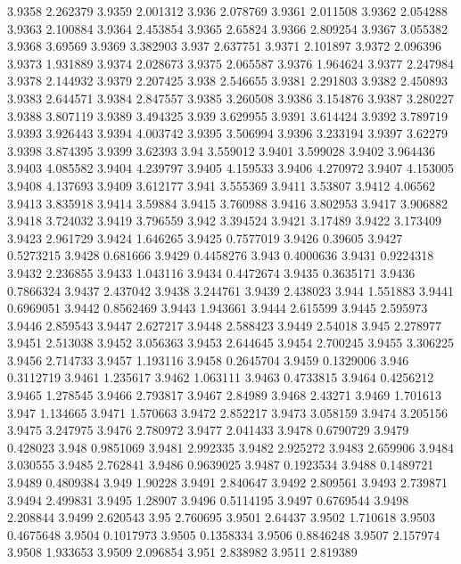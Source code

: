3.9358  2.262379
3.9359  2.001312
3.936  2.078769
3.9361  2.011508
3.9362  2.054288
3.9363  2.100884
3.9364  2.453854
3.9365  2.65824
3.9366  2.809254
3.9367  3.055382
3.9368  3.69569
3.9369  3.382903
3.937  2.637751
3.9371  2.101897
3.9372  2.096396
3.9373  1.931889
3.9374  2.028673
3.9375  2.065587
3.9376  1.964624
3.9377  2.247984
3.9378  2.144932
3.9379  2.207425
3.938  2.546655
3.9381  2.291803
3.9382  2.450893
3.9383  2.644571
3.9384  2.847557
3.9385  3.260508
3.9386  3.154876
3.9387  3.280227
3.9388  3.807119
3.9389  3.494325
3.939  3.629955
3.9391  3.614424
3.9392  3.789719
3.9393  3.926443
3.9394  4.003742
3.9395  3.506994
3.9396  3.233194
3.9397  3.62279
3.9398  3.874395
3.9399  3.62393
3.94  3.559012
3.9401  3.599028
3.9402  3.964436
3.9403  4.085582
3.9404  4.239797
3.9405  4.159533
3.9406  4.270972
3.9407  4.153005
3.9408  4.137693
3.9409  3.612177
3.941  3.555369
3.9411  3.53807
3.9412  4.06562
3.9413  3.835918
3.9414  3.59884
3.9415  3.760988
3.9416  3.802953
3.9417  3.906882
3.9418  3.724032
3.9419  3.796559
3.942  3.394524
3.9421  3.17489
3.9422  3.173409
3.9423  2.961729
3.9424  1.646265
3.9425  0.7577019
3.9426  0.39605
3.9427  0.5273215
3.9428  0.681666
3.9429  0.4458276
3.943  0.4000636
3.9431  0.9224318
3.9432  2.236855
3.9433  1.043116
3.9434  0.4472674
3.9435  0.3635171
3.9436  0.7866324
3.9437  2.437042
3.9438  3.244761
3.9439  2.438023
3.944  1.551883
3.9441  0.6969051
3.9442  0.8562469
3.9443  1.943661
3.9444  2.615599
3.9445  2.595973
3.9446  2.859543
3.9447  2.627217
3.9448  2.588423
3.9449  2.54018
3.945  2.278977
3.9451  2.513038
3.9452  3.056363
3.9453  2.644645
3.9454  2.700245
3.9455  3.306225
3.9456  2.714733
3.9457  1.193116
3.9458  0.2645704
3.9459  0.1329006
3.946  0.3112719
3.9461  1.235617
3.9462  1.063111
3.9463  0.4733815
3.9464  0.4256212
3.9465  1.278545
3.9466  2.793817
3.9467  2.84989
3.9468  2.43271
3.9469  1.701613
3.947  1.134665
3.9471  1.570663
3.9472  2.852217
3.9473  3.058159
3.9474  3.205156
3.9475  3.247975
3.9476  2.780972
3.9477  2.041433
3.9478  0.6790729
3.9479  0.428023
3.948  0.9851069
3.9481  2.992335
3.9482  2.925272
3.9483  2.659906
3.9484  3.030555
3.9485  2.762841
3.9486  0.9639025
3.9487  0.1923534
3.9488  0.1489721
3.9489  0.4809384
3.949  1.90228
3.9491  2.840647
3.9492  2.809561
3.9493  2.739871
3.9494  2.499831
3.9495  1.28907
3.9496  0.5114195
3.9497  0.6769544
3.9498  2.208844
3.9499  2.620543
3.95  2.760695
3.9501  2.64437
3.9502  1.710618
3.9503  0.4675648
3.9504  0.1017973
3.9505  0.1358334
3.9506  0.8846248
3.9507  2.157974
3.9508  1.933653
3.9509  2.096854
3.951  2.838982
3.9511  2.819389
